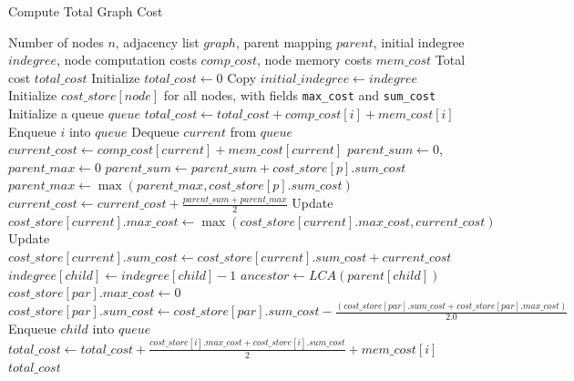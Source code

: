 \documentclass[12pt,a4paper,twoside,openright,bibliography=totocnumbered]{report}
\begin{document}
\begin{algorithm}
\caption{Compute Total Graph Cost}
\label{alg:compute_cost}
\begin{algorithmic}[1]
\REQUIRE Number of nodes $n$, adjacency list $graph$, parent mapping $parent$, initial indegree $indegree$, node computation costs $comp\_cost$, node memory costs $mem\_cost$
\ENSURE Total cost $total\_cost$
\STATE Initialize $total\_cost \gets 0$
\STATE Copy $initial\_indegree \gets indegree$
\STATE Initialize $cost\_store[node]$ for all nodes, with fields \texttt{max\_cost} and \texttt{sum\_cost}
\STATE Initialize a queue $queue$
        \STATE $total\_cost \gets total\_cost + comp\_cost[i] + mem\_cost[i]$
        \STATE Enqueue $i$ into $queue$
    \ENDIF
\ENDFOR
{}
        \STATE Dequeue $current$ from $queue$
        \STATE $current\_cost \gets comp\_cost[current] + mem\_cost[current]$
        \STATE $parent\_sum \gets 0$, $parent\_max \gets 0$
            \STATE $parent\_sum \gets parent\_sum + cost\_store[p].sum\_cost$
            \STATE $parent\_max \gets \max(parent\_max, cost\_store[p].sum\_cost)$
        \ENDFOR
        \STATE $current\_cost \gets current\_cost + \frac{parent\_sum + parent\_max}{2}$
        \STATE Update $cost\_store[current].max\_cost \gets \max(cost\_store[current].max\_cost, current\_cost)$
        \STATE Update $cost\_store[current].sum\_cost \gets cost\_store[current].sum\_cost + current\_cost$
    \ENDIF
        \STATE $indegree[child] \gets indegree[child] - 1$
                \STATE $ancestor \gets LCA(parent[child])$
                    \STATE $cost\_store[par].max\_cost \gets 0$
                    \STATE $cost\_store[par].sum\_cost \gets cost\_store[par].sum\_cost - \frac{(cost\_store[par].sum\_cost + cost\_store[par].max\_cost)}{2.0}$
                \ENDFOR
            \ENDIF
            \STATE Enqueue $child$ into $queue$
        \ENDIF
    \ENDFOR
\ENDWHILE
{}
        \STATE $total\_cost \gets total\_cost + \frac{cost\_store[i].max\_cost + cost\_store[i].sum\_cost}{2} + mem\_cost[i]$
    \ENDIF
\ENDFOR
\RETURN $total\_cost$
\end{algorithmic}
\end{algorithm}
\end{document}
